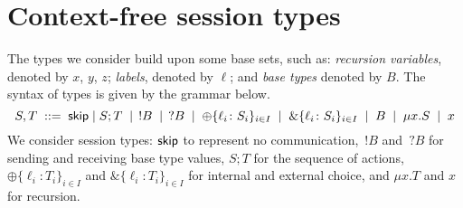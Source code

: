 \section{Context-free session types}
\label{sec:contextfreesession}

The types we consider build upon some base sets, such as:
\emph{recursion variables}, denoted by $x$, $y$, $z$;
\emph{labels}, denoted by $\ell$; and \emph{base types} denoted by
$B$.  The syntax of types is given by the grammar below.%
%
\begin{equation*}
    S,T \; ::= \; \mathsf{skip} \mid S;T \;\mid\; \,!B \;\mid\; \,?B \;\mid\; 
       \oplus\{\ell_i\colon S_i\}_{i\in I} \;\mid\; \&\{\ell_i\colon S_i\}_{i\in I} \;\mid\; B \;\mid\;
       \mu x.S \;\mid\; x
\end{equation*}
We consider session types: $\mathsf{skip}$ to represent no communication,
$\,!B$ and $\,?B$ for sending and receiving base type values,
$S;T$ for the sequence of actions,
$\oplus\{\ell_i\colon T_i\}_{i\in I}$ and
$\&\{\ell_i\colon T_i\}_{i\in I}$ for internal and external choice,
and $\mu x.T$ and $x$ for recursion.


